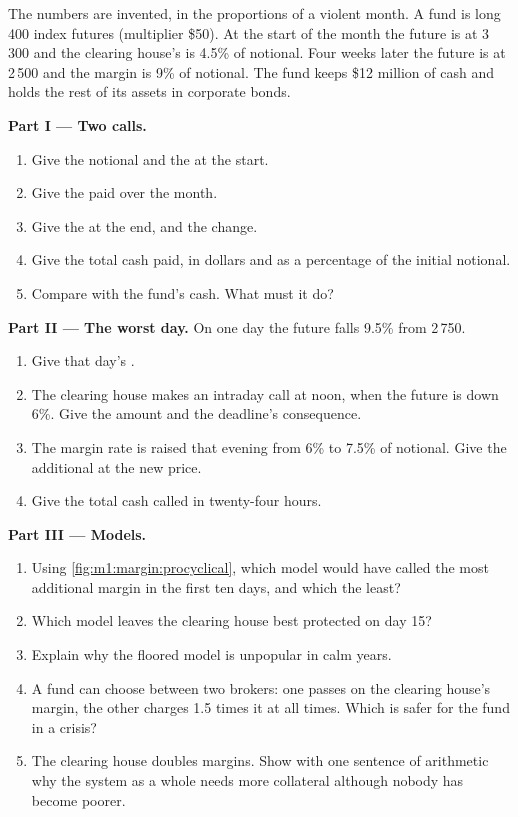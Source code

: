 \begin{problem}\label{pb:m1:margin:1}
The numbers are invented, in the proportions of a violent month. A fund is
long 400 index futures (multiplier \$50). At the start of the month the
future is at 3\,300 and the clearing house's  is 4.5\% of
notional. Four weeks later the future is at 2\,500 and the margin is 9\% of
notional. The fund keeps \$12 million of cash and holds the rest of its
assets in corporate bonds.

\medskip\noindent\textbf{Part I --- Two calls.}
\begin{enumerate}
\item Give the notional and the  at the start.
\item Give the  paid over the month.
\item Give the  at the end, and the change.
\item Give the total cash paid, in dollars and as a percentage of the
initial notional.
\item Compare with the fund's cash. What must it do?
\end{enumerate}

\medskip\noindent\textbf{Part II --- The worst day.}
On one day the future falls 9.5\% from 2\,750.
\begin{enumerate}[resume]
\item Give that day's .
\item The clearing house makes an intraday call at noon, when the future is
down 6\%. Give the amount and the deadline's consequence.
\item The margin rate is raised that evening from 6\% to 7.5\% of notional.
Give the additional  at the new price.
\item Give the total cash called in twenty-four hours.
\end{enumerate}

\medskip\noindent\textbf{Part III --- Models.}
\begin{enumerate}[resume]
\item Using \cref{fig:m1:margin:procyclical}, which model would have called
the most additional margin in the first ten days, and which the least?
\item Which model leaves the clearing house best protected on day 15?
\item Explain why the floored model is unpopular in calm years.
\item A fund can choose between two brokers: one passes on the clearing
house's margin, the other charges 1.5 times it at all times. Which is safer
for the fund in a crisis?
\item The clearing house doubles margins. Show with one sentence of
arithmetic why the system as a whole needs more collateral although nobody
has become poorer.
\end{enumerate}


\end{problem}
